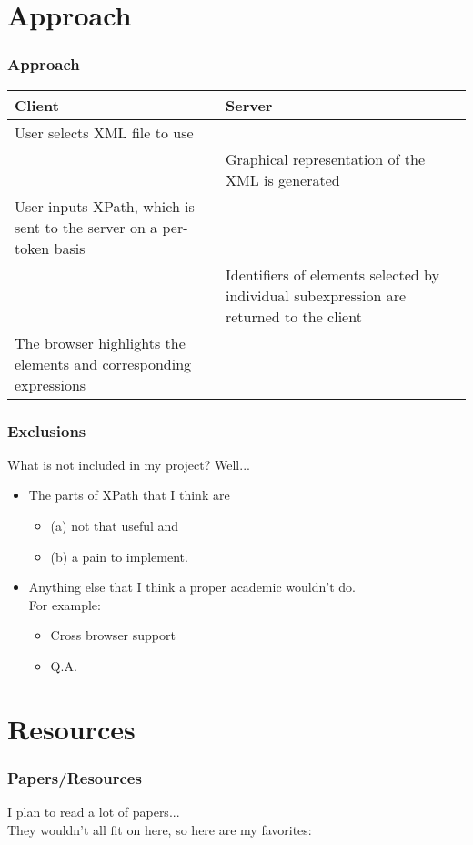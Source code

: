 \documentclass{beamer}
\begin{document}
\section{Approach}
\begin{frame}
\frametitle{Approach}
\begin{tabular*}{\textwidth}{p{} | p{}}
\textbf{Client}					&	\textbf{Server}\\
\hline
\hline
User selects XML file to use	&	\\
\hline
								&	Graphical representation of the XML is generated \\
\hline
User inputs XPath, which is sent to the server on a per-token basis & \\
\hline
								& Identifiers of elements selected by individual
 subexpression are returned to the client \\
\hline The browser highlights the elements and corresponding expressions & \\
\end{tabular*}
\end{frame}



\begin{frame}
\frametitle{Exclusions}
What is not included in my project? Well...
\begin{itemize}
\item The parts of XPath that I think are 
\begin{itemize}
\item (a) not that useful and
\item (b) a pain to implement.
\end{itemize}
\item Anything else that I think a proper academic wouldn't do. \\ For example:
\begin{itemize}
\item Cross browser support
\item Q.A.
\end{itemize}
\end{itemize}

\end{frame}


\section{Resources}
\begin{frame}
\frametitle{Papers/Resources}
I plan to read a lot of papers...\\
They wouldn't all fit on here, so here are my favorites: 
\nocite{chen:indexing}
\nocite{benedikt:structural}
\nocite{scardina:building}
%
 

\end{frame}
\end{document}
